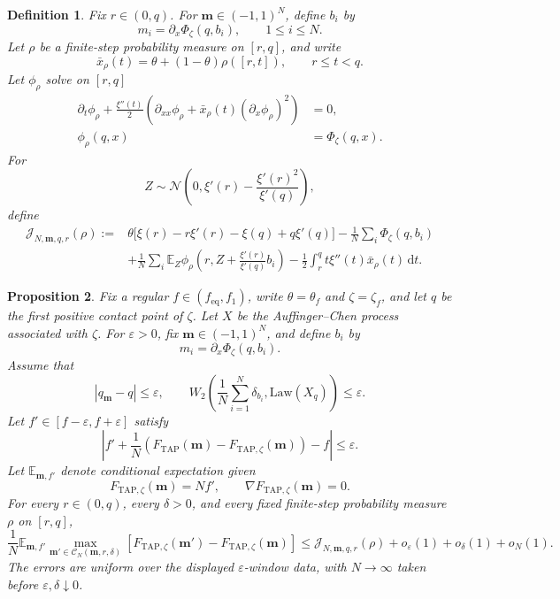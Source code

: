 \documentclass[a4paper,10pt,reqno]{amsart}
\numberwithin{equation}{section}
\newtheorem{proposition}{Proposition}[section]
\newtheorem{definition}[proposition]{Definition}%
\newcommand{\ve}{\varepsilon}
\newcommand{\dE}{\mathbb{E}}%
\newcommand{\Law}{\mathrm{Law}}
\newcommand{\mc}{\mathcal}
\newcommand{\dd}{\mathrm{d}}
\newcommand{\TAP}{\mathrm{TAP}}
\newcommand{\eq}{\mathrm{eq}}
\newcommand{\bfm}{\mathbf{m}}
\begin{document}
	\begin{definition}
		Fix \(r\in(0,q)\). For \(\bfm\in(-1,1)^N\), define \(b_i\) by
		\[
		m_i=\partial_x\Phi_\zeta(q,b_i),
		\qquad 1\le i\le N.
		\]
		Let \(\rho\) be a finite-step probability measure on \([r,q]\), and write
		\[
		\bar x_\rho(t)
		=
		\theta+(1-\theta)\rho([r,t]),
		\qquad r\le t<q.
		\]
		Let \(\phi_\rho\) solve on \([r,q]\)
		\begin{equation}\label{eq:sibling-reduced-PDE}
			\begin{aligned}
				\partial_t\phi_\rho
				+\frac{\xi''(t)}2
				\left(
				\partial_{xx}\phi_\rho
				+\bar x_\rho(t)(\partial_x\phi_\rho)^2
				\right)&=0,\\
				\phi_\rho(q,x)&=\Phi_\zeta(q,x).
			\end{aligned}
		\end{equation}
		For
		\[
		Z\sim\mc N\left(
		0,\xi'(r)-\frac{\xi'(r)^2}{\xi'(q)}
		\right),
		\]
		define
		\[
		\begin{aligned}
			\mc J_{N,\bfm,q,r}(\rho)
			:={}&
			\theta\bigl[\xi(r)-r\xi'(r)-\xi(q)+q\xi'(q)\bigr]
			-\frac1N\sum_i\Phi_\zeta(q,b_i)\\
			&+\frac1N\sum_i
			\dE_Z\phi_\rho\left(
			r,Z+\frac{\xi'(r)}{\xi'(q)}b_i
			\right)
			-\frac12\int_r^q t\xi''(t)\bar x_\rho(t)\,\dd t.
		\end{aligned}
		\]
	\end{definition}
	
	\begin{proposition}\label{prop:sibling-guerra-bound}
		Fix a regular \(f\in(f_{\eq},f_1)\), write
		\(\theta=\theta_f\) and \(\zeta=\zeta_f\), and let \(q\) be the first
		positive contact point of \(\zeta\). Let \(X\) be the
		Auffinger--Chen process associated with \(\zeta\).
		For \(\ve>0\), fix \(\bfm\in(-1,1)^N\), and define \(b_i\) by
		\[
		m_i=\partial_x\Phi_\zeta(q,b_i).
		\]
		Assume that
		\[
		|q_\bfm-q|\le\ve,
		\qquad
		W_2\left(
		\frac1N\sum_{i=1}^N\delta_{b_i},
		\Law(X_q)
		\right)\le\ve.
		\]
		Let \(f'\in[f-\ve,f+\ve]\) satisfy
		\[
		\left|
		f'
		+\frac1N\left(
		F_{\TAP}(\bfm)-F_{\TAP,\zeta}(\bfm)
		\right)
		-f
		\right|
		\le\ve.
		\]
		Let \(\dE_{\bfm,f'}\) denote conditional expectation given
		\[
		F_{\TAP,\zeta}(\bfm)=Nf',
		\qquad
		\nabla F_{\TAP,\zeta}(\bfm)=0.
		\]
		For every \(r\in(0,q)\),
		every \(\delta>0\), and every fixed finite-step probability measure
		\(\rho\) on \([r,q]\),
		\begin{equation}\label{eq:sibling-guerra-bound}
			\frac1N\dE_{\bfm,f'}
			\max_{\bfm'\in\mc C_N(\bfm,r,\delta)}
			\left[
			F_{\TAP,\zeta}(\bfm')-F_{\TAP,\zeta}(\bfm)
			\right]
			\le
			\mc J_{N,\bfm,q,r}(\rho)
			+o_\ve(1)+o_\delta(1)+o_N(1).
		\end{equation}
		The errors are uniform over the displayed \(\ve\)-window data,
		with \(N\to\infty\) taken before
		\(\ve,\delta\downarrow0\).
	\end{proposition}
	
\end{document}

